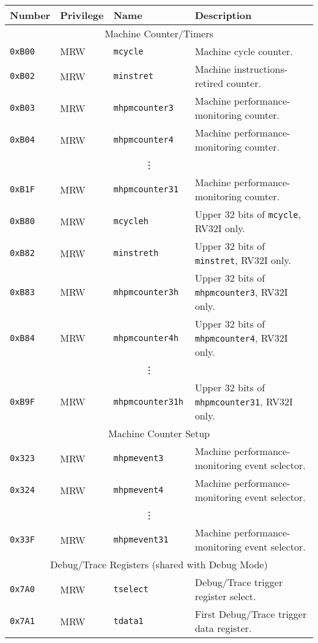 \begin{table}[htb!]
\begin{center}
\begin{tabular}{|l|l|l|l|}
\hline
Number    & Privilege & Name & Description \\
\hline
\multicolumn{4}{|c|}{Machine Counter/Timers} \\
\hline
\tt 0xB00 & MRW  &\tt mcycle         & Machine cycle counter. \\
\tt 0xB02 & MRW  &\tt minstret       & Machine instructions-retired counter. \\
\tt 0xB03 & MRW  &\tt mhpmcounter3   & Machine performance-monitoring counter. \\
\tt 0xB04 & MRW  &\tt mhpmcounter4   & Machine performance-monitoring counter. \\
& & \multicolumn{1}{c|}{\vdots} & \ \\
\tt 0xB1F & MRW  &\tt mhpmcounter31  & Machine performance-monitoring counter. \\
\tt 0xB80 & MRW  &\tt mcycleh        & Upper 32 bits of {\tt mcycle}, RV32I only. \\
\tt 0xB82 & MRW  &\tt minstreth      & Upper 32 bits of {\tt minstret}, RV32I only. \\
\tt 0xB83 & MRW  &\tt mhpmcounter3h  & Upper 32 bits of {\tt mhpmcounter3}, RV32I only. \\
\tt 0xB84 & MRW  &\tt mhpmcounter4h  & Upper 32 bits of {\tt mhpmcounter4}, RV32I only. \\
& & \multicolumn{1}{c|}{\vdots} & \ \\
\tt 0xB9F & MRW  &\tt mhpmcounter31h & Upper 32 bits of {\tt mhpmcounter31}, RV32I only. \\
\hline  
\multicolumn{4}{|c|}{Machine Counter Setup} \\
\hline
\tt 0x323 & MRW  &\tt mhpmevent3     & Machine performance-monitoring event selector. \\
\tt 0x324 & MRW  &\tt mhpmevent4     & Machine performance-monitoring event selector. \\
& & \multicolumn{1}{c|}{\vdots} & \ \\
\tt 0x33F & MRW  &\tt mhpmevent31    & Machine performance-monitoring event selector. \\
\hline
\multicolumn{4}{|c|}{Debug/Trace Registers (shared with Debug Mode)} \\
\hline
\tt 0x7A0 & MRW &\tt tselect & Debug/Trace trigger register select. \\
\tt 0x7A1 & MRW &\tt tdata1 & First Debug/Trace trigger data register. \\

\end{tabular}
\end{center}
\end{table}

